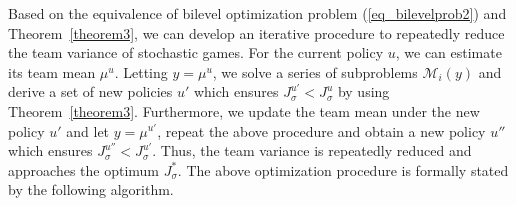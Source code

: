 \documentclass[12pt]{article}
\begin{document}
Based on the equivalence of bilevel optimization problem
(\ref{eq_bilevelprob2}) and Theorem~\ref{theorem3}, we can develop
an iterative procedure to repeatedly reduce the team variance of
stochastic games. For the current policy $u$, we can estimate its
team mean $\mu^u$. Letting $y=\mu^u$, we solve a series of
subproblems $\mathcal M_i(y)$ and derive a set of new policies $u'$
which ensures $J^{u'}_{\sigma} < J^{u}_{\sigma}$ by using
Theorem~\ref{theorem3}. Furthermore, we update the team mean under
the new policy $u'$ and let $y=\mu^{u'}$, repeat the above procedure
and obtain a new policy $u''$ which ensures $J^{u''}_{\sigma} <
J^{u'}_{\sigma}$. Thus, the team variance is repeatedly reduced and
approaches the optimum $J^*_{\sigma}$. The above optimization
procedure is formally stated by the following algorithm.
\end{document}
